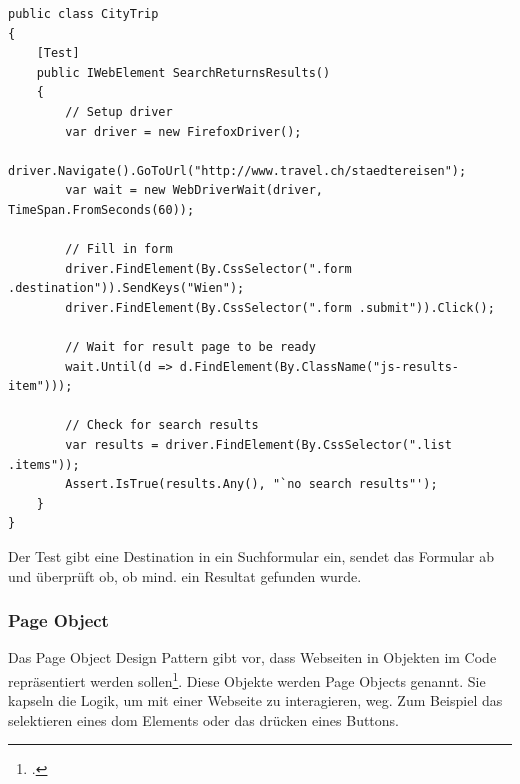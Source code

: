 \begin{lstlisting}        
public class CityTrip
{	    	
	[Test]
	public IWebElement SearchReturnsResults() 
	{
		// Setup driver
		var driver = new FirefoxDriver();
		driver.Navigate().GoToUrl("http://www.travel.ch/staedtereisen");
		var wait = new WebDriverWait(driver, TimeSpan.FromSeconds(60));
		
		// Fill in form
		driver.FindElement(By.CssSelector(".form .destination")).SendKeys("Wien");
		driver.FindElement(By.CssSelector(".form .submit")).Click();
		
		// Wait for result page to be ready
		wait.Until(d => d.FindElement(By.ClassName("js-results-item")));
		
		// Check for search results
		var results = driver.FindElement(By.CssSelector(".list .items"));
		Assert.IsTrue(results.Any(), "`no search results"');
	}
}
\end{lstlisting}

Der Test gibt eine Destination in ein Suchformular ein, sendet das Formular ab und überprüft ob, ob mind. ein Resultat gefunden wurde.

\subsubsection{Page Object}
\label{sec:umsetzung:implementierung:patterns:pageobject}
Das Page Object Design Pattern gibt vor, dass Webseiten in Objekten im Code repräsentiert werden sollen\footcite{PageObjects}. Diese Objekte werden Page Objects genannt. Sie kapseln die Logik, um mit einer Webseite zu interagieren, weg. Zum Beispiel das selektieren eines \gls{dom} Elements oder das drücken eines Buttons.

